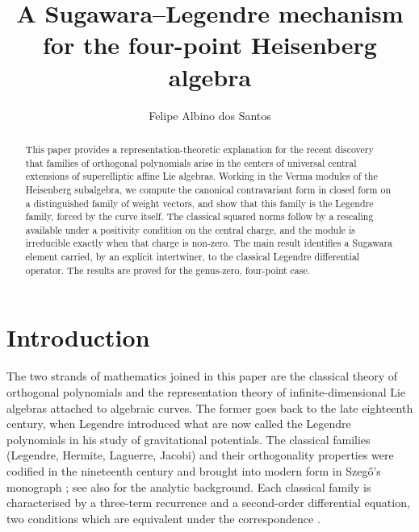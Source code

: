 \documentclass[12pt]{amsart}
\title[Sugawara--Legendre mechanism]{A Sugawara--Legendre mechanism\\
  for the four-point Heisenberg algebra}
\author{Felipe Albino dos Santos}
\date{}
\theoremstyle{plain}
\theoremstyle{definition}
\begin{document}
\begin{abstract}

This paper provides a representation-theoretic explanation for the recent discovery that families of orthogonal polynomials arise in the centers of universal central extensions of superelliptic affine Lie algebras. Working in the Verma modules of the Heisenberg subalgebra, we compute the canonical contravariant form in closed form on a distinguished family of weight vectors, and show that this family is the Legendre family, forced by the curve itself. The classical squared norms follow by a rescaling available under a positivity condition on the central charge, and the module is irreducible exactly when that charge is non-zero. The main result identifies a Sugawara element carried, by an explicit intertwiner, to the classical Legendre differential operator. The results are proved for the genus-zero, four-point case. 

\end{abstract}

\maketitle
\setcounter{tocdepth}{1}
\tableofcontents

\section{Introduction}
\label{sec:intro}

The two strands of mathematics joined in this paper are the classical
theory of orthogonal polynomials and the representation theory of
infinite-dimensional Lie algebras attached to algebraic curves. The
former goes back to the late eighteenth century, when Legendre
introduced what are now called the Legendre polynomials in his study
of gravitational potentials. The classical families (Legendre,
Hermite, Laguerre, Jacobi) and their orthogonality properties were
codified in the nineteenth century and brought into modern form in
Szeg\H{o}'s monograph \cite{Szego1939}; see also
\cite{Whittaker1927} for the analytic background. Each classical
family is characterised by a three-term recurrence and a second-order
differential equation, two conditions which are equivalent under the
correspondence \cite[\S 3.2]{Szego1939}.
\end{document}
